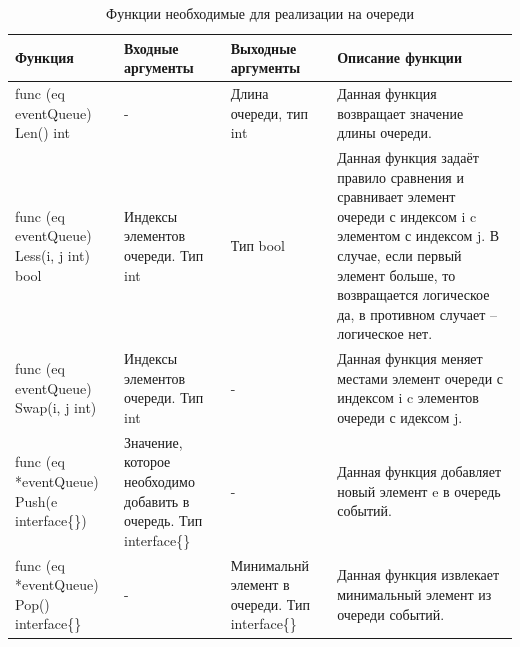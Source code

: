 \begin{table}[]
\centering
\caption{Функции необходимые для реализации на очереди}
\label{tab:queue}
\begin{tabularx}{\textwidth}{|X|X|X|X|}
\hline
Функция                                      & Входные аргументы                                                          & Выходные аргументы                              & Описание функции                                                                                                                                                                                                         \\ \hline
func (eq eventQueue) Len() int               & -                                                                          & Длина очереди, тип int                          & Данная функция возвращает значение длины очереди.                                                                                                                                                                        \\ \hline
func (eq eventQueue) Less(i, j int) bool     & Индексы элементов очереди. Тип int                                         & Тип bool                                        & Данная функция задаёт правило сравнения и  сравнивает элемент очереди с индексом i c элементом с индексом j. В случае, если первый элемент больше, то возвращается логическое да, в противном случает -- логическое нет. \\ \hline
func (eq eventQueue) Swap(i, j int)          & Индексы элементов очереди. Тип int                                         & -                                               & Данная функция меняет местами элемент очереди с индексом i c элементов очереди с идексом j.                                                                                                                              \\ \hline
func (eq *eventQueue) Push(e interface\{\})  & Значение, которое необходимо добавить в очередь. Тип interface\{\}         & -                                               & Данная функция добавляет новый элемент e в очередь событий.                                                                                                                                                              \\ \hline
func (eq *eventQueue) Pop() interface\{\}    & -                                                                          & Минимальнй элемент в очереди. Тип interface\{\} & Данная функция извлекает минимальный элемент из очереди событий.                                                                                                                                                         \\ \hline

\end{tabularx}
\end{table}

